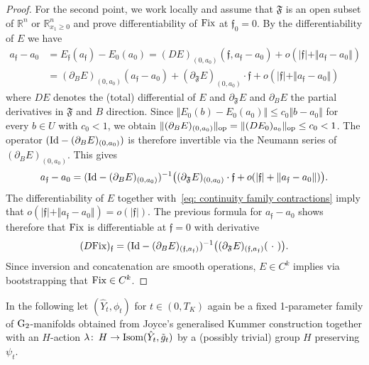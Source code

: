 \documentclass[11pt,a4paper]{scrartcl}
\newcommand{\col}{\colon \thinspace}
\newcommand{\G}{\textup{G}}
\numberwithin{equation}{section}
\theoremstyle{plain}
\theoremstyle{definition}
\theoremstyle{remark}
\begin{document}
\begin{proof}
For the second point, we work locally and assume that $\mathfrak{F}$ is an open subset of $\mathbb{R}^n$ or $\mathbb{R}^n_{x_1\geq 0}$ and prove differentiability of $\textup{Fix}$ at $\mathfrak{f}_0=0$. By the differentiability of $E$ we have
\begin{align*}
a_\mathfrak{f} - a_0 &= E_\mathfrak{f}(a_\mathfrak{f}) - E_0(a_0) = (DE)_{(0,a_0)}(\mathfrak{f},a_{\mathfrak{f}}-a_0) + o (\vert \mathfrak{f} \vert +\Vert a_{\mathfrak{f}}-a_0 \Vert) \\
&= (\partial_B E)_{(0,a_0)}(a_\mathfrak{f} - a_0) + (\partial_{\mathfrak{F}} E)_{(0,a_0)} \cdot \mathfrak{f} + o (\vert \mathfrak{f} \vert+\Vert a_\mathfrak{f} -a_0 \Vert)
\end{align*}
where $DE$ denotes the (total) differential of $E$ and $\partial_{\mathfrak{F}}E$ and $\partial_BE$ the partial derivatives in $\mathfrak{F}$ and $B$ direction. Since $\Vert E_0(b) - E_0(a_0) \Vert \leq c_0 \Vert b - a_0 \Vert$ for every $b \in U$ with $c_0<1$, we obtain $\Vert (\partial_BE)_{(0,a_0)} \Vert_{\textup{op}} = \Vert (DE_0)_{a_0} \Vert_{\textup{op}} \leq c_0 <1$. The operator $(\textup{Id} - (\partial_BE)_{(0,a_0)})$ is therefore invertible via the Neumann series of $(\partial_BE)_{(0,a_0)}$. This gives \[ a_\mathfrak{f} - a_0 = (\textup{Id} - (\partial_BE)_{(0,a_0)} )^{-1} \big((\partial_{\mathfrak{F}} E)_{(0,a_0)} \cdot \mathfrak{f} + o (\vert \mathfrak{f} \vert+\Vert a_\mathfrak{f} -a_0 \Vert)\big). \] The differentiability of $E$ together with~\eqref{eq: continuity family contractions} imply that $o(\vert \mathfrak{f}\vert + \Vert a_\mathfrak{f} -a_0 \Vert)=o(\vert \mathfrak{f} \vert)$. The previous formula for $a_\mathfrak{f}-a_0$ shows therefore that $\textup{Fix}$ is differentiable at $\mathfrak{f}=0$ with derivative \[ (D\textup{Fix})_\mathfrak{f} = (\textup{Id} - (\partial_BE)_{(\mathfrak{f},a_\mathfrak{f})} )^{-1} \big( (\partial_{\mathfrak{F}} E)_{(\mathfrak{f},a_\mathfrak{f})}(\ \cdot\ )\big). \] Since inversion and concatenation are smooth operations, $E \in C^k$ implies via bootstrapping that $\textup{Fix}\in C^k$.
\end{proof}

In the following let $(\hat{Y}_t,\phi_t)$ for $t\in(0,T_K)$ again be a fixed 1-parameter family of $\G_2$-manifolds obtained from Joyce's generalised Kummer construction together with an $H$-action $\lambda \col H \to \textup{Isom}(\hat{Y}_t,\tilde{g}_t)$ by a (possibly trivial) group $H$ preserving $\psi_t$.
\end{document}

